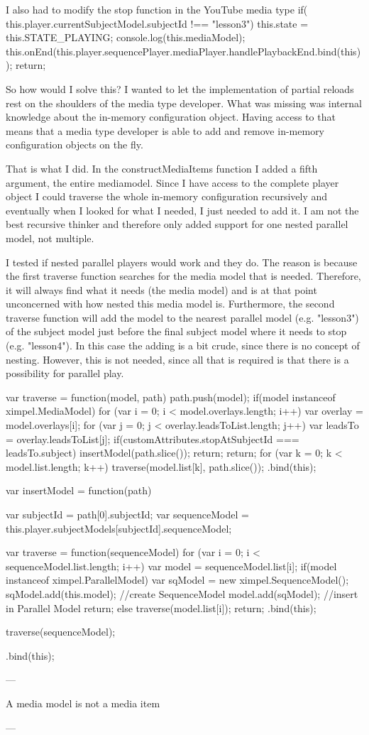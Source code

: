 I also had to modify the stop function in the YouTube media type
	if( this.player.currentSubjectModel.subjectId !== "lesson3") {
		this.state = this.STATE_PLAYING;
		console.log(this.mediaModel);
		this.onEnd(this.player.sequencePlayer.mediaPlayer.handlePlaybackEnd.bind(this));
		return;
	}
	
So how would I solve this? I wanted to let the implementation of partial reloads rest on the shoulders of the media type developer. What was missing was internal knowledge about the in-memory configuration object. Having access to that means that a media type developer is able to add and remove in-memory configuration objects on the fly.

That is what I did. In the constructMediaItems function I added a fifth argument, the entire mediamodel. Since I have access to the complete player object I could traverse the whole in-memory configuration recursively and eventually when I looked for what I needed, I just needed to add it. I am not the best recursive thinker and therefore only added support for one nested parallel model, not multiple. 

I tested if nested parallel players would work and they do. The reason is because the first traverse function searches for the media model that is needed. Therefore, it will always find what it needs (the media model) and is at that point unconcerned with how nested this media model is. Furthermore, the second traverse function will add the model to the nearest parallel model (e.g. "lesson3") of the subject model just before the final subject model where it needs to stop (e.g. "lesson4"). In this case the adding is a bit crude, since there is no concept of nesting. However, this is not needed, since all that is required is that there is a possibility for parallel play.

	var traverse = function(model, path){
		path.push(model);
		if(model instanceof ximpel.MediaModel){
			for (var i = 0; i < model.overlays.length; i++) {
				var overlay = model.overlays[i];
				for (var j = 0; j < overlay.leadsToList.length; j++) {
					var leadsTo = overlay.leadsToList[j];
					if(customAttributes.stopAtSubjectId === leadsTo.subject){
						insertModel(path.slice());
						return;
					}
				}
			}
			return;
		}
		for (var k = 0; k < model.list.length; k++) {
			traverse(model.list[k], path.slice());
		}
	}.bind(this);

	var insertModel = function(path){
		var subjectId = path[0].subjectId;
		var sequenceModel = this.player.subjectModels[subjectId].sequenceModel;

		var traverse = function(sequenceModel){
			for (var i = 0; i < sequenceModel.list.length; i++) {
				var model = sequenceModel.list[i];
				if(model instanceof ximpel.ParallelModel){
					var sqModel = new ximpel.SequenceModel();
					sqModel.add(this.model); //create SequenceModel
					model.add(sqModel);					//insert in Parallel Model
					return;
				} else {
					traverse(model.list[i]);
				}
			}
			return;
		}.bind(this);

		traverse(sequenceModel);
	}.bind(this);

---

A media model is not a media item

---

